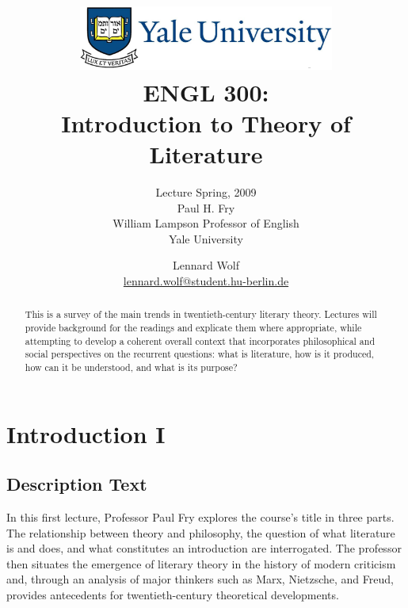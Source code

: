 \documentclass[]{scrartcl}
\begin{document}
\title{
	\includegraphics*[width=0.63\textwidth]{images/yale_logo.png}\\
	\vspace{24pt}
	ENGL 300:\\Introduction to Theory of Literature}
\subtitle{Lecture Spring, 2009\\
          Paul H. Fry\\
          William Lampson Professor of English \\ 
          Yale University}
\author{Lennard Wolf\\
        \href{mailto:lennard.wolf@student.hu-berlin.de}{lennard.wolf@student.hu-berlin.de}}
\maketitle
\begin{abstract}

This is a survey of the main trends in twentieth-century literary theory. Lectures will provide background for the readings and explicate them where appropriate, while attempting to develop a coherent overall context that incorporates philosophical and social perspectives on the recurrent questions: what is literature, how is it produced, how can it be understood, and what is its purpose?

\end{abstract}
\newpage

\tableofcontents

\listoffigures
\newpage


\section{Introduction I}



\subsection{Description Text}
In this first lecture, Professor Paul Fry explores the course's title in three parts. The relationship between theory and philosophy, the question of what literature is and does, and what constitutes an introduction are interrogated. The professor then situates the emergence of literary theory in the history of modern criticism and, through an analysis of major thinkers such as Marx, Nietzsche, and Freud, provides antecedents for twentieth-century theoretical developments.
\end{document}
